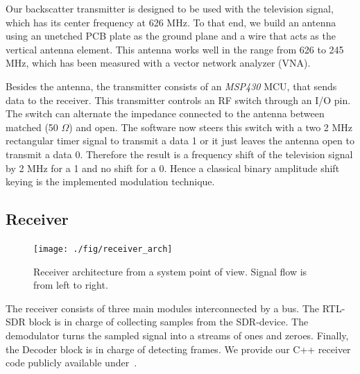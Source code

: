 \documentclass[conference]{IEEEtran}
\begin{document}
Our backscatter transmitter is designed to be used with the television
signal, which has its center frequency at 626 MHz. To that end, we build
an
antenna using an unetched PCB plate as the ground plane and a wire that acts
as the vertical antenna element.%
This antenna works well in the range from 626 to 245 MHz, which has been
measured with a vector network analyzer (VNA). 

Besides the antenna, the transmitter consists of an \textit{MSP430} MCU,
that sends data to the receiver. This transmitter controls an RF switch
through an I/O pin. The switch can alternate the impedance connected to
the antenna between matched (50 \ensuremath{\Omega}) and open. The
software now steers this switch with a two 2 MHz rectangular timer
signal to transmit a data 1 or it just leaves the antenna open to
transmit a data 0. Therefore the result is a frequency shift of the
television signal by 2 MHz for a 1 and no shift for a 0. Hence a classical
binary amplitude shift keying is the implemented modulation technique.   
 
\subsection{Receiver}
\begin{figure}[h]
\centering
\texttt{[image: ./fig/receiver\_arch]}
\caption{Receiver architecture from a system point of view. Signal flow is from left to right.}
\label{fig:receiver_arch}
\end{figure}
The receiver consists of three main modules interconnected by a bus. The
RTL-SDR block is in charge of collecting samples from the SDR-device. The
demodulator turns the sampled signal into a streams of ones and zeroes.
Finally, the Decoder block is in charge of detecting frames. We provide our C++
receiver code publicly available under~\cite{s3xm3x_backscatterBASKReceiver}.
\end{document}
